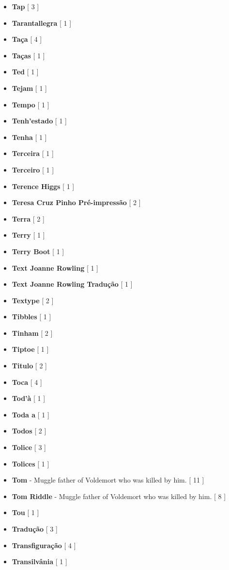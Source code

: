 \documentclass[a4paper]{article}
\begin{document}
{\begin{itemize}
	\item \textbf{Tap} [ 3 ]
	\item \textbf{Tarantallegra} [ 1 ]
	\item \textbf{Taça} [ 4 ]
	\item \textbf{Taças} [ 1 ]
	\item \textbf{Ted} [ 1 ]
	\item \textbf{Tejam} [ 1 ]
	\item \textbf{Tempo} [ 1 ]
	\item \textbf{Tenh'estado} [ 1 ]
	\item \textbf{Tenha} [ 1 ]
	\item \textbf{Terceira} [ 1 ]
	\item \textbf{Terceiro} [ 1 ]
	\item \textbf{Terence Higgs} [ 1 ]
	\item \textbf{Teresa Cruz Pinho Pré-impressão} [ 2 ]
	\item \textbf{Terra} [ 2 ]
	\item \textbf{Terry} [ 1 ]
	\item \textbf{Terry Boot} [ 1 ]
	\item \textbf{Text Joanne Rowling} [ 1 ]
	\item \textbf{Text Joanne Rowling Tradução} [ 1 ]
	\item \textbf{Textype} [ 2 ]
	\item \textbf{Tibbles} [ 1 ]
	\item \textbf{Tinham} [ 2 ]
	\item \textbf{Tiptoe} [ 1 ]
	\item \textbf{Titulo} [ 2 ]
	\item \textbf{Toca} [ 4 ]
	\item \textbf{Tod'à} [ 1 ]
	\item \textbf{Toda a} [ 1 ]
	\item \textbf{Todos} [ 2 ]
	\item \textbf{Tolice} [ 3 ]
	\item \textbf{Tolices} [ 1 ]
	\item \textbf{Tom} - Muggle father of Voldemort who was killed by him. [ 11 ]
	\item \textbf{Tom Riddle} - Muggle father of Voldemort who was killed by him. [ 8 ]
	\item \textbf{Tou} [ 1 ]
	\item \textbf{Tradução} [ 3 ]
	\item \textbf{Transfiguração} [ 4 ]
	\item \textbf{Transilvânia} [ 1 ]

\end{itemize}}
\end{document}
